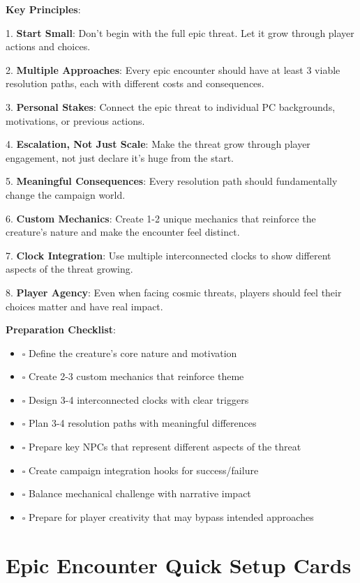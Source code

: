 \documentclass[11pt]{article}
\begin{document}
\begin{mdframed}[backgroundcolor=epicbg]
\textbf{Key Principles}:

1. \textbf{Start Small}: Don't begin with the full epic threat. Let it grow through player actions and choices.

2. \textbf{Multiple Approaches}: Every epic encounter should have at least 3 viable resolution paths, each with different costs and consequences.

3. \textbf{Personal Stakes}: Connect the epic threat to individual PC backgrounds, motivations, or previous actions.

4. \textbf{Escalation, Not Just Scale}: Make the threat grow through player engagement, not just declare it's huge from the start.

5. \textbf{Meaningful Consequences}: Every resolution path should fundamentally change the campaign world.

6. \textbf{Custom Mechanics}: Create 1-2 unique mechanics that reinforce the creature's nature and make the encounter feel distinct.

7. \textbf{Clock Integration}: Use multiple interconnected clocks to show different aspects of the threat growing.

8. \textbf{Player Agency}: Even when facing cosmic threats, players should feel their choices matter and have real impact.

\textbf{Preparation Checklist}:
\begin{itemize}[leftmargin=*]
\item $\square$ Define the creature's core nature and motivation
\item $\square$ Create 2-3 custom mechanics that reinforce theme
\item $\square$ Design 3-4 interconnected clocks with clear triggers
\item $\square$ Plan 3-4 resolution paths with meaningful differences
\item $\square$ Prepare key NPCs that represent different aspects of the threat
\item $\square$ Create campaign integration hooks for success/failure
\item $\square$ Balance mechanical challenge with narrative impact
\item $\square$ Prepare for player creativity that may bypass intended approaches
\end{itemize}
\end{mdframed}

\section*{Epic Encounter Quick Setup Cards}
\end{document}
